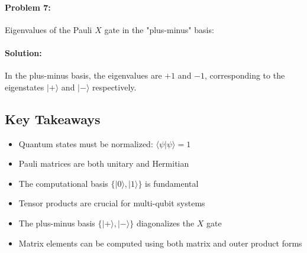 \documentclass{article}
\begin{document}
\paragraph{Problem 7:} Eigenvalues of the Pauli \( X \) gate in the "plus-minus" basis:

\paragraph{Solution:}
In the plus-minus basis, the eigenvalues are \( +1 \) and \( -1 \), corresponding to the eigenstates \( |+\rangle \) and \( |-\rangle \) respectively.

\subsection{Key Takeaways}
\begin{conceptbox}
\begin{itemize}
    \item Quantum states must be normalized: \( \langle \psi | \psi \rangle = 1 \)
    \item Pauli matrices are both unitary and Hermitian
    \item The computational basis \( \{|0\rangle, |1\rangle\} \) is fundamental
    \item Tensor products are crucial for multi-qubit systems
    \item The plus-minus basis \( \{|+\rangle, |-\rangle\} \) diagonalizes the \( X \) gate
    \item Matrix elements can be computed using both matrix and outer product forms
\end{itemize}
\end{conceptbox}
\end{document}
